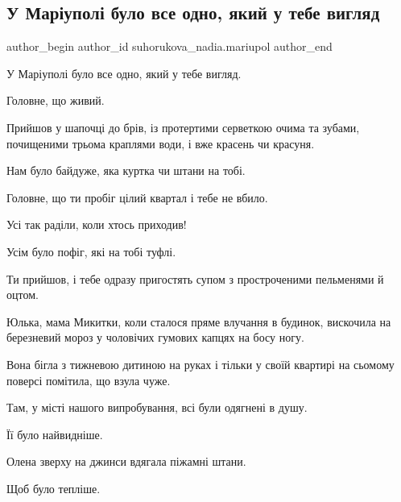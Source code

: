  
 
 
 
 

\subsection{У Маріуполі було все одно, який у тебе вигляд}
\label{sec:06_04_2023.fb.suhorukova_nadia.mariupol.1.golovne_scho_zhyvyj}

\ifcmt
 author_begin
   author_id suhorukova_nadia.mariupol
 author_end
\fi

У Маріуполі було все одно, який у тебе вигляд.

Головне, що живий. 

Прийшов у шапочці до брів, із протертими серветкою очима та зубами, почищеними
трьома краплями води, і вже красень чи красуня.

Нам було байдуже, яка куртка чи штани на тобі. 

Головне, що ти пробіг цілий квартал і тебе не вбило. 

Усі так раділи, коли хтось приходив! 

Усім було пофіг, які на тобі туфлі.

Ти прийшов, і тебе одразу пригостять супом з простроченими пельменями й оцтом.

Юлька, мама Микитки, коли сталося пряме влучання в будинок, вискочила на
березневий мороз у чоловічих гумових капцях на босу ногу.

Вона бігла з тижневою дитиною на руках і тільки у своїй квартирі на сьомому
поверсі помітила, що взула чуже. 

Там, у місті нашого випробування, всі були одягнені в душу.

Її було найвидніше.

Олена зверху на джинси вдягала піжамні штани.

Щоб було тепліше.

